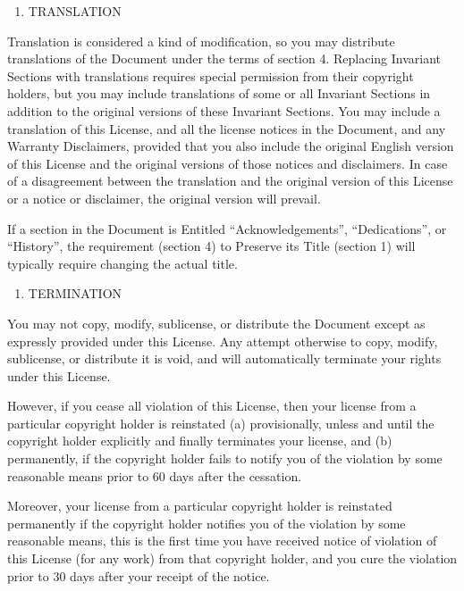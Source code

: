 \documentclass[12pt,a4paperpaper,]{report}
\providecommand{\tightlist}{%
  \setlength{\itemsep}{0pt}\setlength{\parskip}{0pt}}
\begin{document}
\begin{enumerate}
\def\labelenumi{\arabic{enumi}.}
\setcounter{enumi}{7}
\tightlist
\item
  TRANSLATION
\end{enumerate}

Translation is considered a kind of modification, so you may distribute
translations of the Document under the terms of section 4. Replacing
Invariant Sections with translations requires special permission from
their copyright holders, but you may include translations of some or all
Invariant Sections in addition to the original versions of these
Invariant Sections. You may include a translation of this License, and
all the license notices in the Document, and any Warranty Disclaimers,
provided that you also include the original English version of this
License and the original versions of those notices and disclaimers. In
case of a disagreement between the translation and the original version
of this License or a notice or disclaimer, the original version will
prevail.

If a section in the Document is Entitled ``Acknowledgements'',
``Dedications'', or ``History'', the requirement (section 4) to Preserve
its Title (section 1) will typically require changing the actual title.

\begin{enumerate}
\def\labelenumi{\arabic{enumi}.}
\setcounter{enumi}{8}
\tightlist
\item
  TERMINATION
\end{enumerate}

You may not copy, modify, sublicense, or distribute the Document except
as expressly provided under this License. Any attempt otherwise to copy,
modify, sublicense, or distribute it is void, and will automatically
terminate your rights under this License.

However, if you cease all violation of this License, then your license
from a particular copyright holder is reinstated (a) provisionally,
unless and until the copyright holder explicitly and finally terminates
your license, and (b) permanently, if the copyright holder fails to
notify you of the violation by some reasonable means prior to 60 days
after the cessation.

Moreover, your license from a particular copyright holder is reinstated
permanently if the copyright holder notifies you of the violation by
some reasonable means, this is the first time you have received notice
of violation of this License (for any work) from that copyright holder,
and you cure the violation prior to 30 days after your receipt of the
notice.
\end{document}
